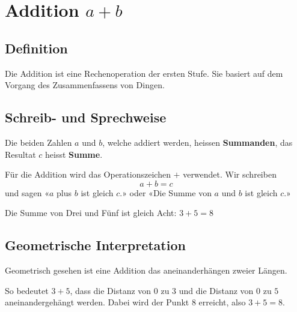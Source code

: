 \newpage
\section{Addition $a+b$}

\subsection{Definition}

Die Addition ist eine Rechenoperation der ersten Stufe. Sie basiert auf dem Vorgang des Zusammenfassens von Dingen.

\subsection{Schreib- und Sprechweise}
Die beiden Zahlen $a$ und $b$, welche addiert werden, heissen \textbf{Summanden}, das Resultat $c$ heisst \textbf{Summe}.

Für die Addition wird das Operationszeichen $+$ verwendet. Wir schreiben
\[
  a + b = c
\]
und sagen «$a$ plus $b$ ist gleich $c$.» oder «Die Summe von $a$ und $b$ ist gleich $c$.»
\begin{example}
  Die Summe von Drei und Fünf ist gleich Acht: $3 + 5 = 8$
\end{example}

\subsection{Geometrische Interpretation}

Geometrisch gesehen ist eine Addition das aneinanderhängen zweier Längen.
\begin{center}
\end{center}

So bedeutet $3+5$, dass die Distanz von $0$ zu $3$ und die Distanz von $0$ zu $5$ aneinandergehängt werden. Dabei wird der Punkt $8$ erreicht, also $3+5 = 8$.

